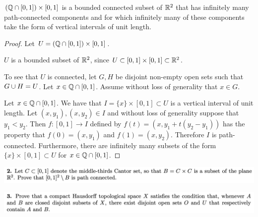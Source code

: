\begin{enumerate}
\begin{claim*}
    $(\mathbb{Q} \cap [0, 1]) \times [0, 1]$ is a bounded connected subset of $\mathbb{R}^2$ that has infinitely many
    path-connected components and for which infinitely many of these components take the form of vertical
    intervals of unit length.
  \end{claim*}

  \begin{proof}
    Let $U = (\mathbb{Q} \cap [0, 1]) \times [0, 1]$.

    $U$ is a bounded subset of $\mathbb{R}^2$, since $U \subset [0, 1] \times [0, 1] \subset \mathbb{R}^2$.

    To see that $U$ is connected, let $G, H$ be disjoint non-empty open sets such that $G \cup H = U$.
    Let $x \in \mathbb{Q} \cap [0, 1]$. Assume without loss of generality that $x \in G$.

    Let $x \in \mathbb{Q} \cap [0, 1]$. We have that $I = \{x\} \times [0, 1] \subset U$ is a vertical interval of unit
    length. Let $(x, y_1), (x, y_2) \in I$ and without loss of generality suppose that $y_1 < y_2$.
    Then $f: [0, 1] \to I$ defined by $f(t) = (x, y_1 + t(y_2 - y_1))$ has the property that $f(0) = (x, y_1)$
    and $f(1) = (x, y_2)$. Therefore $I$ is path-connected. Furthermore, there are infinitely many subsets of
    the form $\{x\} \times [0, 1] \subset U$ for $x \in \mathbb{Q} \cap [0, 1]$.
  \end{proof}
\end{enumerate}



\newpage
\begin{mdframed}
\includegraphics[width=400pt]{img/analysis--berkeley-202a-hw13-e2f7.png}
\end{mdframed}

\newpage
\begin{mdframed}
\includegraphics[width=400pt]{img/analysis--berkeley-202a-hw13-983a.png}
\end{mdframed}

